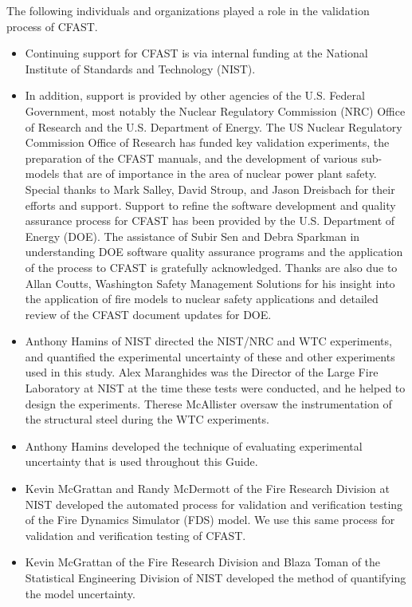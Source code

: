 \documentclass[12pt]{book}
\begin{document}
The following individuals and organizations played a role in the validation process of CFAST.
\begin{itemize}
\item Continuing support for CFAST is via internal funding at the National Institute of Standards and Technology (NIST).

\item In addition, support is provided by other agencies of the U.S. Federal Government, most notably the Nuclear Regulatory Commission (NRC) Office of Research and the U.S. Department of Energy. The US Nuclear Regulatory Commission Office of Research has funded key validation experiments, the preparation of the CFAST manuals, and the development of various sub-models that are of importance in the area of nuclear power plant safety. Special thanks to Mark Salley, David Stroup, and Jason Dreisbach for their efforts and support. Support to refine the software development and quality assurance process for CFAST has been provided by the U.S. Department of Energy (DOE). The assistance of Subir Sen and Debra Sparkman in understanding DOE software quality assurance programs and the application of the process to CFAST is gratefully acknowledged.  Thanks are also due to Allan Coutts, Washington Safety Management Solutions for his insight into the application of fire models to nuclear safety applications and detailed review of the CFAST document updates for DOE.

\item Anthony Hamins of NIST directed the NIST/NRC and WTC experiments, and quantified the experimental uncertainty of these and other experiments used in this study. Alex Maranghides was the Director of the Large Fire Laboratory at NIST at the time these tests were conducted, and he helped to design the experiments. Therese McAllister oversaw the instrumentation of the structural steel during the WTC experiments.

\item Anthony Hamins developed the technique of evaluating experimental uncertainty that is used throughout this Guide.

\item Kevin McGrattan and Randy McDermott of the Fire Research Division at NIST developed the automated process for validation and verification testing of the Fire Dynamics Simulator (FDS) model.  We use this same process for validation and verification testing of CFAST.

\item Kevin McGrattan of the Fire Research Division and Blaza Toman of the Statistical Engineering Division of NIST developed the method of quantifying the model uncertainty.


\end{itemize}
\end{document}
